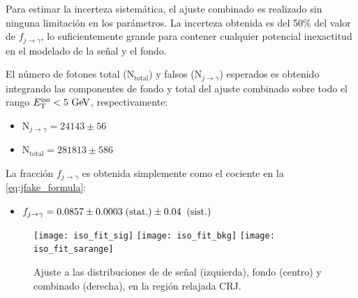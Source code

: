 
Para estimar la incerteza sistemática, el ajuste combinado es realizado
sin ninguna limitación en los parámetros. La incerteza obtenida es del
50\% del valor de $f_{j\to\gamma}$, lo suficientemente grande para contener
cualquier potencial inexactitud en el modelado de la señal y el fondo.


El número de fotones total (N$_\text{total}$) y falsos (N$_{j\to\gamma}$)
esperados es obtenido integrando las componentes de fondo y total del ajuste
combinado sobre todo el rango $\etiso<5\gev$, respectivamente:

\begin{itemize}
\item[] N$_{j\to\gamma}= 24143 \pm 56$

\item[] N$_\text{total} = 281813 \pm 586$
\end{itemize}

La fracción $f_{j\to \gamma}$ es obtenida simplemente como el cociente
en la \cref{eq:jfake_formula}:

\begin{itemize}
\item[] $f_{j\rightarrow\gamma} = 0.0857 \pm 0.0003 \mbox{$\;$(stat.)} \pm 0.04 \;\mbox{$\;$(sist.)}$
\end{itemize}

\begin{figure}[!hp]
  \centering

  \texttt{[image: iso\_fit\_sig]}
  \texttt{[image: iso\_fit\_bkg]}
  \texttt{[image: iso\_fit\_sarange]}

  \caption{Ajuste a las distribuciones de {\etiso} de señal (izquierda),
    fondo (centro) y combinado (derecha), en la región relajada CRJ.}
  \label{fig:jetfake_combfit}

\end{figure}



